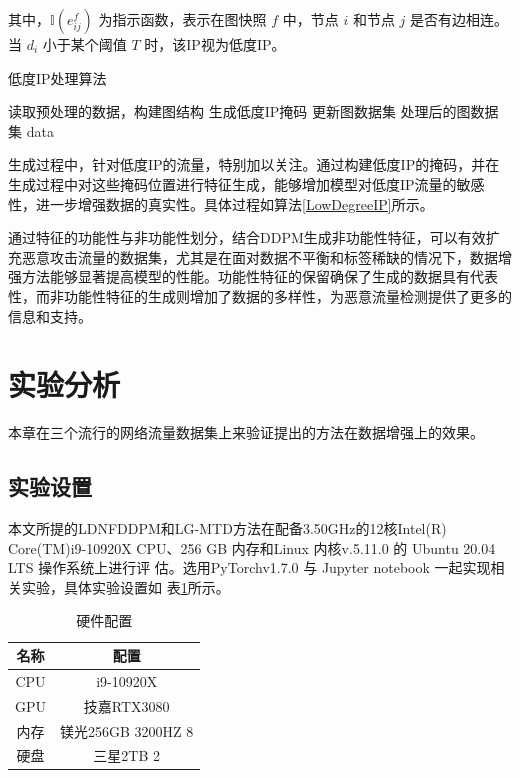 \documentclass[promaster]{thesis-uestc}
\begin{document}
其中，\(\mathbb{I}(e_{ij}^f)\) 为指示函数，表示在图快照 \(f\) 中，节点 \(i\) 和节点 \(j\) 是否有边相连。当 \(d_i\) 小于某个阈值 \(T\) 时，该IP视为低度IP。

\begin{algorithm}[h!]
\caption{低度IP处理算法}
\label{LowDegreeIP}
\BlankLine
读取预处理的数据，构建图结构\;
生成低度IP掩码\;
更新图数据集\;
\Return 处理后的图数据集 data\;
\end{algorithm}
生成过程中，针对低度IP的流量，特别加以关注。通过构建低度IP的掩码，并在生成过程中对这些掩码位置进行特征生成，能够增加模型对低度IP流量的敏感性，进一步增强数据的真实性。具体过程如算法\ref{LowDegreeIP}所示。

通过特征的功能性与非功能性划分，结合DDPM生成非功能性特征，可以有效扩充恶意攻击流量的数据集，尤其是在面对数据不平衡和标签稀缺的情况下，数据增强方法能够显著提高模型的性能。功能性特征的保留确保了生成的数据具有代表性，而非功能性特征的生成则增加了数据的多样性，为恶意流量检测提供了更多的信息和支持。

\section{实验分析}
本章在三个流行的网络流量数据集上来验证提出的方法在数据增强上的效果。
\subsection{实验设置}

本文所提的LDNFDDPM和LG-MTD方法在配备3.50GHz的12核Intel(R)\\Core(TM)i9-10920X
 CPU、256 GB 内存和Linux 内核v.5.11.0 的 Ubuntu 20.04 LTS 操作系统上进行评
估。选用PyTorchv1.7.0 与 Jupyter notebook 一起实现相关实验，具体实验设置如
表\ref{tbl:hardware_config}所示。
\begin{table}[h!]
    \centering
    \caption{硬件配置}
    \begin{tabular}{c||c} \hline\hline
        \textbf{名称} & \textbf{配置} \\ \hline
        CPU & i9-10920X \\ \hline
        GPU & 技嘉RTX3080 \\ \hline
        内存 & 镁光256GB 3200HZ 8 \\ \hline
        硬盘 & 三星2TB 2 \\ \hline\hline
    \end{tabular}
    \label{tbl:hardware_config}
\end{table}
\end{document}
